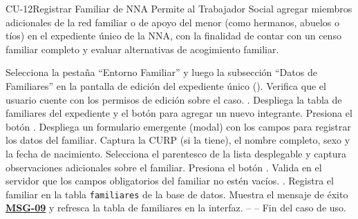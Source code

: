 \begin{UseCase}{CU-12}{Registrar Familiar de NNA}{
	Permite al Trabajador Social agregar miembros adicionales de la red familiar o de apoyo del menor (como hermanos, abuelos o tíos) en el expediente único de la NNA, con la finalidad de contar con un censo familiar completo y evaluar alternativas de acogimiento familiar.
}
\end{UseCase}

\begin{UCtrayectoria}
	\UCpaso[\UCactor] Selecciona la pestaña ``Entorno Familiar'' y luego la subsección ``Datos de Familiares'' en la pantalla de edición del expediente único ().
	\UCpaso Verifica que el usuario cuente con los permisos de edición sobre el caso. .
	\UCpaso Despliega la tabla de familiares del expediente y el botón para agregar un nuevo integrante.
	\UCpaso[\UCactor] Presiona el botón .
	\UCpaso Despliega un formulario emergente (modal) con los campos para registrar los datos del familiar.
	\UCpaso[\UCactor] Captura la CURP (si la tiene), el nombre completo, sexo y la fecha de nacimiento.
	\UCpaso[\UCactor] Selecciona el parentesco de la lista desplegable y captura observaciones adicionales sobre el familiar.
	\UCpaso[\UCactor] Presiona el botón .
	\UCpaso Valida en el servidor que los campos obligatorios del familiar no estén vacíos. .
	\UCpaso Registra el familiar en la tabla \texttt{familiares} de la base de datos.
	\UCpaso Muestra el mensaje de éxito \hyperlink{mMSG09}{\bf MSG-09} y refresca la tabla de familiares en la interfaz.
	\UCpaso[] -- -- Fin del caso de uso.
\end{UCtrayectoria}

